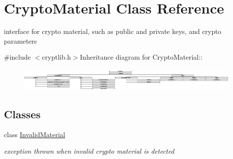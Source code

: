 \hypertarget{class_crypto_material}{
\section{CryptoMaterial Class Reference}
\label{class_crypto_material}
}


interface for crypto material, such as public and private keys, and crypto parameters  


{\ttfamily \#include $<$cryptlib.h$>$}Inheritance diagram for CryptoMaterial::\begin{figure}[H]
\begin{center}
\leavevmode
\includegraphics[height=1.2043cm]{class_crypto_material}
\end{center}
\end{figure}
\subsection*{Classes}
\begin{DoxyCompactItemize}
\item 
class \hyperlink{class_crypto_material_1_1_invalid_material}{InvalidMaterial}
\begin{DoxyCompactList}\small\item\em exception thrown when invalid crypto material is detected \item\end{DoxyCompactList}\end{DoxyCompactItemize}
